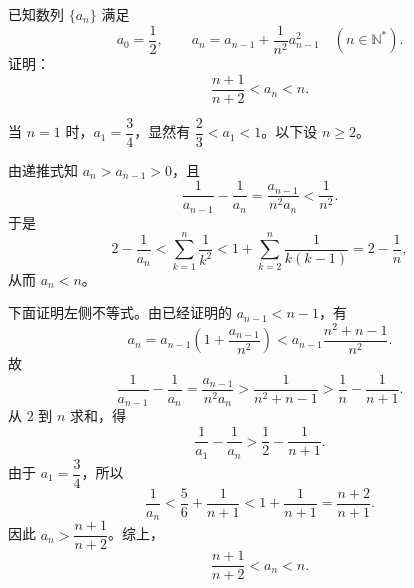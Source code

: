 \documentclass[zihao=-4]{exam-zh}
\begin{document}
\begin{question}[points=12]
已知数列 $\{a_n\}$ 满足
\[
 a_0=\frac12,\qquad a_n=a_{n-1}+\frac1{n^2}a_{n-1}^2\quad(n\in\mathbb N^*).
\]
证明：
\[
 \frac{n+1}{n+2}<a_n<n.
\]
\begin{solution}
当 $n=1$ 时，$a_1=\dfrac34$，显然有 $\dfrac23<a_1<1$。以下设 $n\ge2$。

由递推式知 $a_n>a_{n-1}>0$，且
\[
 \frac1{a_{n-1}}-\frac1{a_n}
 =\frac{a_{n-1}}{n^2a_n}<\frac1{n^2}.
\]
于是
\[
 2-\frac1{a_n}
 <\sum_{k=1}^{n}\frac1{k^2}
 <1+\sum_{k=2}^{n}\frac1{k(k-1)}
 =2-\frac1n,
\]
从而 $a_n<n$。

下面证明左侧不等式。由已经证明的 $a_{n-1}<n-1$，有
\[
 a_n=a_{n-1}\left(1+\frac{a_{n-1}}{n^2}\right)
 <a_{n-1}\frac{n^2+n-1}{n^2}.
\]
故
\[
 \frac1{a_{n-1}}-\frac1{a_n}
 =\frac{a_{n-1}}{n^2a_n}
 >\frac1{n^2+n-1}
 >\frac1n-\frac1{n+1}.
\]
从 $2$ 到 $n$ 求和，得
\[
 \frac1{a_1}-\frac1{a_n}>\frac12-\frac1{n+1}.
\]
由于 $a_1=\dfrac34$，所以
\[
 \frac1{a_n}<\frac56+\frac1{n+1}<1+\frac1{n+1}=\frac{n+2}{n+1}.
\]
因此 $a_n>\dfrac{n+1}{n+2}$。综上，
\[
 \boxed{\dfrac{n+1}{n+2}<a_n<n}.
\]
\end{solution}
\end{question}
\end{document}
